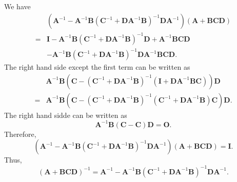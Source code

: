 \subsection{}
\label{2.26}
We have
%
\begin{equation}
\begin{aligned}
&
\left(
	\mathbf{A} ^ {- 1}
	-
	\mathbf{A} ^ {- 1}
	\mathbf{B}
	\left(
		\mathbf{C} ^ {- 1}
		+
		\mathbf{D} 
		\mathbf{A} ^ {- 1} 
		\mathbf{B}
	\right) ^ {- 1}
	\mathbf{D} 
	\mathbf{A} ^ {- 1}
\right)
(\mathbf{A} + \mathbf{B} \mathbf{C} \mathbf{D})
\\
=&
\mathbf{I}
-
\mathbf{A} ^ {- 1}
\mathbf{B}
\left(
	\mathbf{C} ^ {- 1}
	+
	\mathbf{D} 
	\mathbf{A} ^ {- 1} 
	\mathbf{B}
\right) ^ {- 1}
\mathbf{D}
+
\mathbf{A} ^ {- 1}
\mathbf{B}
\mathbf{C}
\mathbf{D}
\\
&-
\mathbf{A} ^ {- 1}
\mathbf{B}
\left(
	\mathbf{C} ^ {- 1}
	+
	\mathbf{D} 
	\mathbf{A} ^ {- 1} 
	\mathbf{B}
\right) ^ {- 1}
\mathbf{D}
\mathbf{A} ^ {- 1}
\mathbf{B}
\mathbf{C}
\mathbf{D}.
\end{aligned}
\end{equation}
%
The right hand side except the first term can be written as
%
\begin{equation}
\begin{aligned}
&
\mathbf{A} ^ {- 1}
\mathbf{B}
\left(
	\mathbf{C}
	-
	\left(
		\mathbf{C} ^ {- 1}
		+
		\mathbf{D} 
		\mathbf{A} ^ {- 1} 
		\mathbf{B}
	\right) ^ {- 1}
	\left(
		\mathbf{I}
		+
		\mathbf{D}
		\mathbf{A} ^ {- 1}
		\mathbf{B}
		\mathbf{C}
	\right)
\right)
\mathbf{D}
\\
=&
\mathbf{A} ^ {- 1}
\mathbf{B}
\left(
	\mathbf{C}
	-
	\left(
		\mathbf{C} ^ {- 1}
		+
		\mathbf{D} 
		\mathbf{A} ^ {- 1} 
		\mathbf{B}
	\right) ^ {- 1}
	\left(
		\mathbf{C} ^ {- 1}
		+
		\mathbf{D}
		\mathbf{A} ^ {- 1}
		\mathbf{B}
	\right)
	\mathbf{C}
\right)
\mathbf{D}.
\end{aligned}
\end{equation}
%
The right hand sidde can be written as
%
\begin{equation}
\mathbf{A} ^ {- 1}
\mathbf{B}
\left(
	\mathbf{C}
	-
	\mathbf{C}
\right)
\mathbf{D}
=
\mathbf{O}.
\end{equation}
%
Therefore,
%
\begin{equation}
\left(
	\mathbf{A} ^ {- 1}
	-
	\mathbf{A} ^ {- 1}
	\mathbf{B}
	\left(
		\mathbf{C} ^ {- 1}
		+
		\mathbf{D} 
		\mathbf{A} ^ {- 1} 
		\mathbf{B}
	\right) ^ {- 1}
	\mathbf{D} 
	\mathbf{A} ^ {- 1}
\right)
(\mathbf{A} + \mathbf{B} \mathbf{C} \mathbf{D})
=
\mathbf{I}.
\end{equation}
%
Thus,
%
\begin{equation}
(\mathbf{A} + \mathbf{B} \mathbf{C} \mathbf{D}) ^ {- 1}
=
\mathbf{A} ^ {- 1}
-
\mathbf{A} ^ {- 1}
\mathbf{B}
\left(
	\mathbf{C} ^ {- 1}
	+
	\mathbf{D} 
	\mathbf{A} ^ {- 1} 
	\mathbf{B}
\right) ^ {- 1}
\mathbf{D} 
\mathbf{A} ^ {- 1}.
\end{equation}
%


